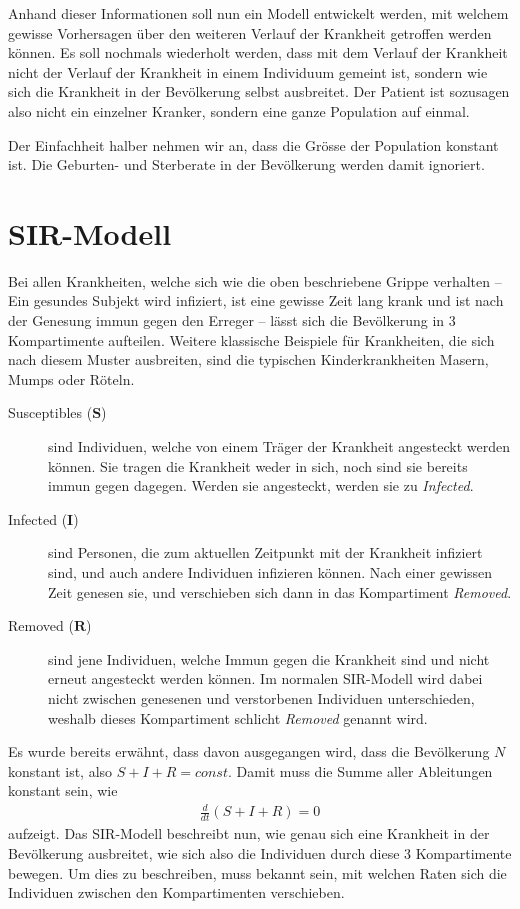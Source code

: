 \begin{refsection}
Anhand dieser Informationen soll nun ein Modell entwickelt werden, mit welchem gewisse Vorhersagen über den weiteren Verlauf der Krankheit getroffen werden können. 
Es soll nochmals wiederholt werden, dass mit dem Verlauf der Krankheit nicht der Verlauf der Krankheit in einem Individuum gemeint ist, sondern wie sich die Krankheit in der Bevölkerung selbst ausbreitet. 
Der Patient ist sozusagen also nicht ein einzelner Kranker, sondern eine ganze Population auf einmal.

Der Einfachheit halber nehmen wir an, dass die Grösse der Population konstant ist.
Die Geburten- und Sterberate in der Bevölkerung werden damit ignoriert.

\section{SIR-Modell}
Bei allen Krankheiten, welche sich wie die oben beschriebene Grippe verhalten -- Ein gesundes Subjekt wird infiziert, ist eine gewisse Zeit lang krank und ist nach der Genesung immun gegen den Erreger -- lässt sich die Bevölkerung in 3 Kompartimente aufteilen. Weitere klassische Beispiele für Krankheiten, die sich nach diesem Muster ausbreiten, sind die typischen Kinderkrankheiten Masern, Mumps oder Röteln.
\begin{description}
  \item [Susceptibles ($\mathbf{S}$)] sind Individuen, welche von einem Träger der Krankheit angesteckt werden können. Sie tragen die Krankheit weder in sich, noch sind sie bereits immun gegen dagegen. Werden sie angesteckt, werden sie zu \emph{Infected}.
  \item [Infected ($\mathbf{I}$)] sind Personen, die zum aktuellen Zeitpunkt mit der Krankheit infiziert sind, und auch andere Individuen infizieren können. Nach einer gewissen Zeit genesen sie, und verschieben sich dann in das Kompartiment \emph{Removed}.
  \item [Removed ($\mathbf{R}$)] sind jene Individuen, welche Immun gegen die Krankheit sind und nicht erneut angesteckt werden können. Im normalen SIR-Modell wird dabei nicht zwischen genesenen und verstorbenen Individuen unterschieden, weshalb dieses Kompartiment schlicht \emph{Removed} genannt wird.
\end{description}

Es wurde bereits erwähnt, dass davon ausgegangen wird, dass die Bevölkerung $N$ konstant ist, also $S + I + R = const$. Damit muss die Summe aller Ableitungen konstant sein, wie
\begin{align*}
  \frac{d}{dt}\left(S+I+R\right) = 0
\end{align*}
aufzeigt. Das SIR-Modell beschreibt nun, wie genau sich eine Krankheit in der Bevölkerung ausbreitet, wie sich also die Individuen durch diese 3 Kompartimente bewegen.
Um dies zu beschreiben, muss bekannt sein, mit welchen Raten sich die Individuen zwischen den Kompartimenten verschieben.


\end{refsection}
